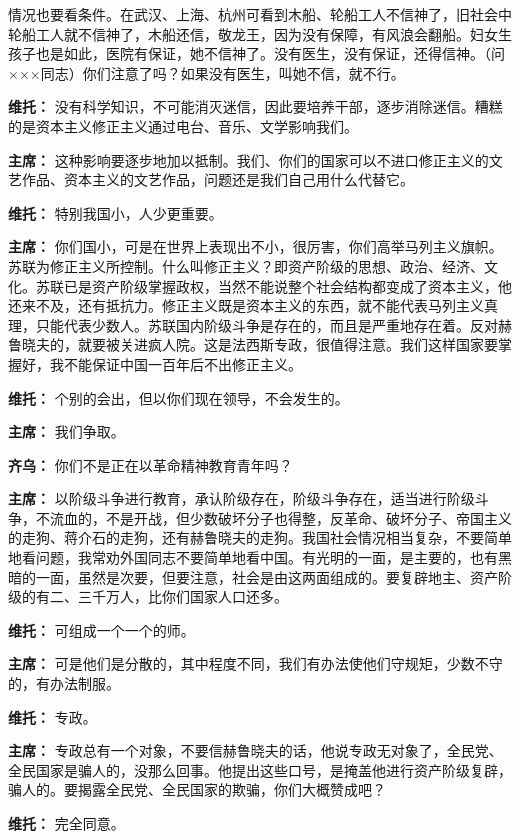 \begin{list}{}
{情况也要看条件。在武汉、上海、杭州可看到木船、轮船工人不信神了，旧社会中轮船工人就不信神了，木船还信，敬龙王，因为没有保障，有风浪会翻船。妇女生孩子也是如此，医院有保证，她不信神了。没有医生，没有保证，还得信神。（问×××同志）你们注意了吗？如果没有医生，叫她不信，就不行。}
\item[\textbf{维托：}]{没有科学知识，不可能消灭迷信，因此要培养干部，逐步消除迷信。糟糕的是资本主义修正主义通过电台、音乐、文学影响我们。}
\item[\textbf{主席：}]{这种影响要逐步地加以抵制。我们、你们的国家可以不进口修正主义的文艺作品、资本主义的文艺作品，问题还是我们自己用什么代替它。}
\item[\textbf{维托：}] 特别我国小，人少更重要。
\item[\textbf{主席：}] 你们国小，可是在世界上表现出不小，很厉害，你们高举马列主义旗帜。苏联为修正主义所控制。什么叫修正主义？即资产阶级的思想、政治、经济、文化。苏联已是资产阶级掌握政权，当然不能说整个社会结构都变成了资本主义，他还来不及，还有抵抗力。修正主义既是资本主义的东西，就不能代表马列主义真理，只能代表少数人。苏联国内阶级斗争是存在的，而且是严重地存在着。反对赫鲁晓夫的，就要被关进疯人院。这是法西斯专政，很值得注意。我们这样国家要掌握好，我不能保证中国一百年后不出修正主义。
\item[\textbf{维托：}] 个别的会出，但以你们现在领导，不会发生的。
\item[\textbf{主席：}] 我们争取。
\item[\textbf{齐乌：}] 你们不是正在以革命精神教育青年吗？
\item[\textbf{主席：}] 以阶级斗争进行教育，承认阶级存在，阶级斗争存在，适当进行阶级斗争，不流血的，不是开战，但少数破坏分子也得整，反革命、破坏分子、帝国主义的走狗、蒋介石的走狗，还有赫鲁晓夫的走狗。我国社会情况相当复杂，不要简单地看问题，我常劝外国同志不要简单地看中国。有光明的一面，是主要的，也有黑暗的一面，虽然是次要，但要注意，社会是由这两面组成的。要复辟地主、资产阶级的有二、三千万人，比你们国家人口还多。
\item[\textbf{维托：}] 可组成一个一个的师。
\item[\textbf{主席：}] 可是他们是分散的，其中程度不同，我们有办法使他们守规矩，少数不守的，有办法制服。
\item[\textbf{维托：}] 专政。
\item[\textbf{主席：}] 专政总有一个对象，不要信赫鲁晓夫的话，他说专政无对象了，全民党、全民国家是骗人的，没那么回事。他提出这些口号，是掩盖他进行资产阶级复辟，骗人的。要揭露全民党、全民国家的欺骗，你们大概赞成吧？
\item[\textbf{维托：}] 完全同意。

\end{list}
